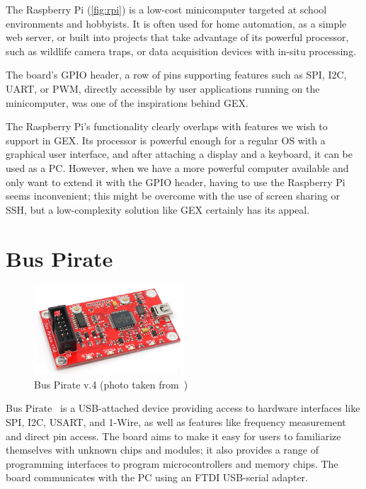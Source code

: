 The Raspberry Pi (\cref{fig:rpi}) is a low-cost minicomputer targeted at school environments and hobbyists. It is often used for home automation, as a simple web server, or built into projects that take advantage of its powerful processor, such as wildlife camera traps, or data acquisition devices with in-situ processing.

The board's \gls{GPIO} header, a row of pins supporting features such as \gls{SPI}, \gls{I2C}, \gls{UART}, or \gls{PWM}, directly accessible by user applications running on the minicomputer, was one of the inspirations behind GEX.

The Raspberry Pi's functionality clearly overlaps with features we wish to support in GEX. Its processor is powerful enough for a regular \gls{OS} with a graphical user interface, and after attaching a display and a keyboard, it can be used as a \gls{PC}. However, when we have a more powerful computer available and only want to extend it with the \gls{GPIO} header, having to use the Raspberry Pi seems inconvenient; this might be overcome with the use of screen sharing or \gls{SSH}, but a low-complexity solution like GEX certainly has its appeal.

\section{Bus Pirate}

\begin{figure}[H]
	\centering
	\includegraphics[width=0.5\textwidth] {img/buspirate.jpg}
	\caption{\label{fig:buspirate}Bus Pirate v.4 (photo taken from~\cite{buspirate-product-page})}
\end{figure}


Bus Pirate~\cite{buspirate} is a USB-attached device providing access to hardware interfaces like \gls{SPI}, \gls{I2C}, \gls{USART}, and 1-Wire, as well as features like frequency measurement and direct pin access. The board aims to make it easy for users to familiarize themselves with unknown chips and modules; it also provides a range of programming interfaces to program microcontrollers and memory chips. The board communicates with the \gls{PC} using an FTDI USB-serial adapter.

